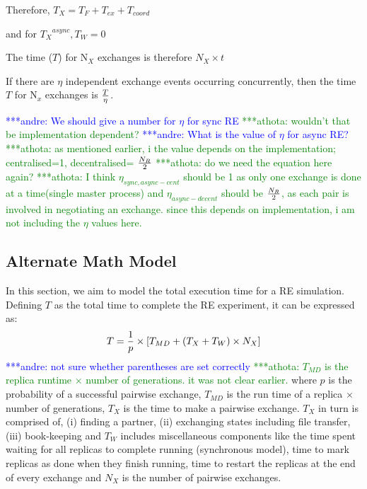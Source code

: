 \documentclass{rspublic}
\newcommand{\alnote}[1]{ {\textcolor{blue} { ***andre: #1 }}}
\newcommand{\athotanote}[1]{ {\textcolor{green} { ***athota: #1 }}}
\newcommand{\alnote}[1]{}
\newcommand{\athotanote}[1]{}
\begin{document}
Therefore, ${T_{X}} = {T_F + T_{ex} + T_{coord}}$ 

and for ${T_{X}}^{async}, T_W = 0$

The time ($T$) for N$_{X}$ exchanges is therefore $N_{X} \times t$

If there are $\eta$ independent exchange events occurring
concurrently, then the time $T$ for N$_x$ exchanges is $T \over \eta$.

\alnote{We should give a number for $\eta$ for sync
  RE}\athotanote{wouldn't that be implementation dependent?}
\alnote{What is the value of $\eta$ for async RE?} \athotanote{as
  mentioned earlier, i the value depends on the implementation;
  centralised=1, decentralised= $N_R\over2$} \athotanote{do we need
  the equation here again?}  \athotanote{I think
  $\eta_{sync,async-cent}$ should be 1 as only one exchange is done at
  a time(single master process) and $\eta_{async-decent}$ should be
  $N_R \over 2$, as each pair is involved in negotiating an
  exchange. since this depends on implementation, i am not including
  the $\eta$ values here.}

\subsection{Alternate Math Model}

In this section, we aim to model the total execution time for a RE
simulation.  Defining $T$ as the total time to complete the RE
experiment, it can be expressed as:
\begin{eqnarray}
T = {1\over p} \times [T_{MD}+ (T_{X} + T_{W}) \times N_X]
\label{eq:totaltime}
\end{eqnarray}
\alnote{not sure whether parentheses are set correctly}
\athotanote{$T_{MD}$ is the replica runtime $\times$ number of
  generations. it was not clear earlier.}  where $p$ is the
probability of a successful pairwise exchange, $T_{MD}$ is the run
time of a replica $\times$ number of generations, $T_{X}$ is the time
to make a pairwise exchange.  $T_X$ in turn is comprised of, (i)
finding a partner, (ii) exchanging states including file transfer,
(iii) book-keeping and $T_{W}$ includes miscellaneous components like
the time spent waiting for all replicas to complete running
(synchronous model), time to mark replicas as done when they finish
running, time to restart the replicas at the end of every exchange and
$N_X$ is the number of pairwise exchanges.
\end{document}
